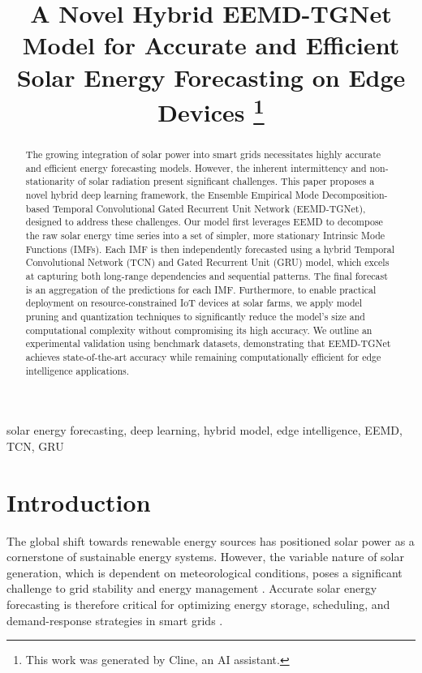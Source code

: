 \documentclass[conference]{IEEEtran}
\begin{document}
\title{A Novel Hybrid EEMD-TGNet Model for Accurate and Efficient Solar Energy Forecasting on Edge Devices
\thanks{This work was generated by Cline, an AI assistant.}
}

\author{
}

\maketitle

\begin{abstract}
The growing integration of solar power into smart grids necessitates highly accurate and efficient energy forecasting models. However, the inherent intermittency and non-stationarity of solar radiation present significant challenges. This paper proposes a novel hybrid deep learning framework, the Ensemble Empirical Mode Decomposition-based Temporal Convolutional Gated Recurrent Unit Network (EEMD-TGNet), designed to address these challenges. Our model first leverages EEMD to decompose the raw solar energy time series into a set of simpler, more stationary Intrinsic Mode Functions (IMFs). Each IMF is then independently forecasted using a hybrid Temporal Convolutional Network (TCN) and Gated Recurrent Unit (GRU) model, which excels at capturing both long-range dependencies and sequential patterns. The final forecast is an aggregation of the predictions for each IMF. Furthermore, to enable practical deployment on resource-constrained IoT devices at solar farms, we apply model pruning and quantization techniques to significantly reduce the model's size and computational complexity without compromising its high accuracy. We outline an experimental validation using benchmark datasets, demonstrating that EEMD-TGNet achieves state-of-the-art accuracy while remaining computationally efficient for edge intelligence applications.
\end{abstract}

\begin{IEEEkeywords}
solar energy forecasting, deep learning, hybrid model, edge intelligence, EEMD, TCN, GRU
\end{IEEEkeywords}

\section{Introduction}
The global shift towards renewable energy sources has positioned solar power as a cornerstone of sustainable energy systems. However, the variable nature of solar generation, which is dependent on meteorological conditions, poses a significant challenge to grid stability and energy management \cite{b2}. Accurate solar energy forecasting is therefore critical for optimizing energy storage, scheduling, and demand-response strategies in smart grids \cite{b1}.
\end{document}
